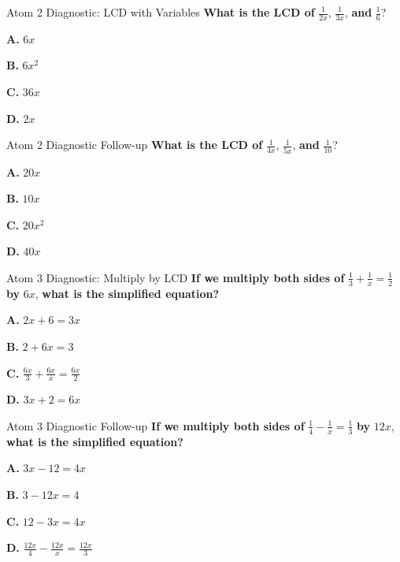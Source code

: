 \documentclass[12pt]{beamer}
\begin{document}
\begin{frame}{Atom 2 Diagnostic: LCD with Variables}
\textbf{What is the LCD of} $\displaystyle\frac{1}{2x}$, $\displaystyle\frac{1}{3x}$, \textbf{and} $\displaystyle\frac{1}{6}$?

\vspace{1cm}

\textbf{A.} $6x$ \hfill {}

\textbf{B.} $6x^2$

\textbf{C.} $36x$

\textbf{D.} $2x$
\end{frame}

\begin{frame}{Atom 2 Diagnostic Follow-up}
\textbf{What is the LCD of} $\displaystyle\frac{1}{4x}$, $\displaystyle\frac{1}{5x}$, \textbf{and} $\displaystyle\frac{1}{10}$?

\vspace{1cm}

\textbf{A.} $20x$ \hfill {}

\textbf{B.} $10x$

\textbf{C.} $20x^2$

\textbf{D.} $40x$
\end{frame}

\begin{frame}{Atom 3 Diagnostic: Multiply by LCD}
\textbf{If we multiply both sides of} $\displaystyle\frac{1}{3} + \frac{1}{x} = \frac{1}{2}$ \textbf{by} $6x$, \textbf{what is the simplified equation?}

\vspace{0.5cm}

\textbf{A.} $2x + 6 = 3x$ \hfill {}

\textbf{B.} $2 + 6x = 3$

\textbf{C.} $\displaystyle\frac{6x}{3} + \frac{6x}{x} = \frac{6x}{2}$

\textbf{D.} $3x + 2 = 6x$
\end{frame}

\begin{frame}{Atom 3 Diagnostic Follow-up}
\textbf{If we multiply both sides of} $\displaystyle\frac{1}{4} - \frac{1}{x} = \frac{1}{3}$ \textbf{by} $12x$, \textbf{what is the simplified equation?}

\vspace{0.5cm}

\textbf{A.} $3x - 12 = 4x$ \hfill {}

\textbf{B.} $3 - 12x = 4$

\textbf{C.} $12 - 3x = 4x$

\textbf{D.} $\displaystyle\frac{12x}{4} - \frac{12x}{x} = \frac{12x}{3}$
\end{frame}
\end{document}
